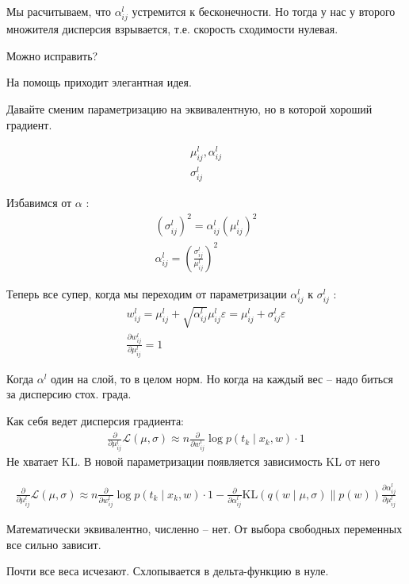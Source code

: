 \documentclass{minimal}
\begin{document}
Мы расчитываем, что $\alpha_{ij}^l$ устремится к бесконечности. Но тогда у нас у второго множителя дисперсия взрывается, т.е. скорость сходимости нулевая.

Можно исправить?

На помощь приходит элегантная идея.

Давайте сменим параметризацию на эквивалентную, но в которой хороший градиент.

\begin{gather*}
  \mu_{ij}^l, \alpha_{ij}^l\\
  \sigma_{ij}^l
\end{gather*}

Избавимся от $\alpha$ :
\begin{gather*}
  (\sigma_{ij}^l)^2=\alpha_{ij}^l(\mu_{ij}^l)^2\\
  \alpha_{ij}^l=\left(\frac{\sigma_{ij}^l}{\mu_{ij}^l}\right)^2
\end{gather*}

Теперь все супер, когда мы переходим от параметризации $\alpha_{ij}^l$ к $\sigma_{ij}^l$ :
\begin{gather*}
  w_{ij}^l=\mu_{ij}^l+\sqrt{\alpha_{ij}^l}\mu_{ij}^l\varepsilon=\mu_{ij}^l+\sigma_{ij}^l\varepsilon\\
\frac{\partial w_{ij}^l}{\partial \mu_{ij}^l}=1
\end{gather*}

Когда $\alpha^l$ один на слой, то в целом норм. Но когда на каждый вес -- надо биться за дисперсию стох. града.

Как себя ведет дисперсия градиента:
\begin{gather*}
  \frac{\partial }{\partial \mu_{ij}^l}\mathcal{L}(\mu,\sigma)\approx n\frac{\partial }{\partial w_{ij}^l}\log p(t_k\mid x_k,w)\cdot 1
\end{gather*}
Не хватает $\mathrm{KL}$. В новой параметризации появляется зависимость KL от него

\begin{gather*}
  \frac{\partial }{\partial \mu_{ij}^l}\mathcal{L}(\mu,\sigma)\approx n\frac{\partial }{\partial w_{ij}^l}\log p(t_k\mid x_k,w)\cdot 1-\frac{\partial }{\partial \alpha_{ij}^l}\mathrm{KL}\left(q(w\mid \mu,\sigma)\|p(w)\right)\frac{\partial \alpha_{ij}^l}{\partial \mu_{ij}^l}
\end{gather*}

Математически эквивалентно, численно -- нет. От выбора свободных переменных все сильно зависит.

Почти все веса исчезают. Схлопывается в дельта-функцию в нуле.
\end{document}

